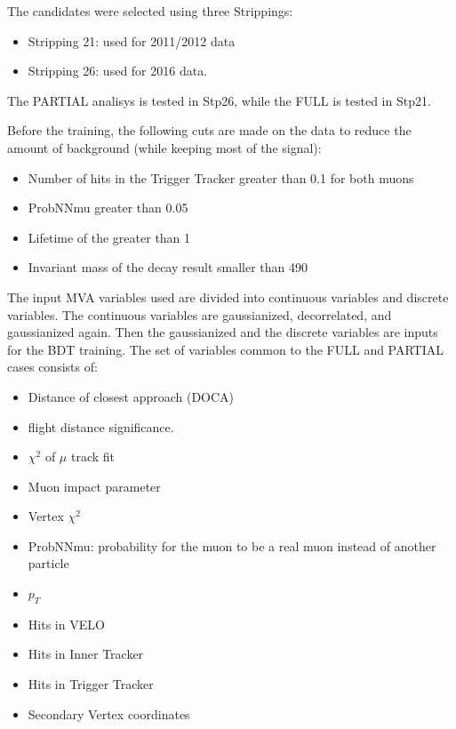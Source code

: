The candidates were selected using three Strippings: 
\begin{itemize}
\item Stripping 21: used for 2011/2012 data
\item Stripping 26: used for 2016 data.
\end{itemize}

The PARTIAL analisys is tested in Stp26, while the FULL is tested in Stp21.

Before the training, the following cuts are made on the data to reduce the amount of background (while keeping most of the signal):
\begin{itemize}
\item Number of hits in the Trigger Tracker greater than 0.1 for both muons
\item ProbNNmu greater than 0.05 
\item Lifetime of the \KS greater than 1
\item Invariant mass of the decay result smaller than 490 \mev
\end{itemize}
The input MVA variables used are divided into continuous variables and discrete variables. The continuous variables are gaussianized, decorrelated, and gaussianized again. Then the gaussianized and the discrete 
variables are inputs for the BDT training. 
The set of variables common to the FULL and PARTIAL cases consists of:
\begin{itemize}
\item Distance of closest approach (DOCA)
\item \KS flight distance significance. 
\item $\chi^2$ of $\mu$ track fit
\item Muon impact parameter
\item Vertex $\chi^2$
\item ProbNNmu: probability for the muon to be a real muon instead of another particle
\item \KS $p_T$ 
\end{itemize}


\begin{itemize}
\item Hits in VELO 
\item Hits in Inner Tracker
\item Hits in Trigger Tracker
\item Secondary Vertex coordinates 
\end{itemize}

